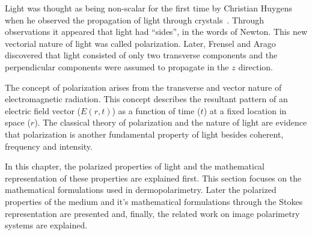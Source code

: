 Light was thought as being non-scalar for the first time by Christian Huygens when he observed the propagation of light through crystals~\cite{goldstein2003polarized}.
Through observations it appeared that light had ``sides'', in the words of Newton.
This new vectorial nature of light was called polarization.
Later, Frensel and Arago discovered that light consisted of only two transverse components and the perpendicular components were assumed to propagate in the $z$ direction.

The concept of polarization arises from the transverse and vector nature of electromagnetic radiation.
This concept describes the resultant pattern of an electric field vector ($E(r,t)$) as a function of time ($t$) at a fixed location in space ($r$).
The classical theory of polarization and the nature of light are evidence that polarization is another fundamental property of light besides coherent, frequency and intensity.

In this chapter, the polarized properties of light and the mathematical representation of these properties are explained first.
This section focuses on the mathematical formulations used in dermopolarimetry. 
Later the polarized properties of the medium and it's mathematical formulations through the Stokes representation are presented and, finally, the related work on image polarimetry systems are explained.



